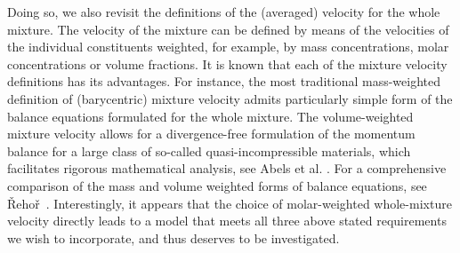 \documentclass[a4paper]{article}
\begin{document}
Doing so, we also revisit the definitions of the (averaged) velocity for the whole mixture. The velocity of the mixture can be defined by means of the velocities of the individual constituents weighted, for example, by mass concentrations, molar concentrations or volume fractions. It is known that each of the mixture velocity definitions has its advantages. For instance, the most traditional mass-weighted definition of (barycentric) mixture velocity admits particularly simple form of the balance equations formulated for the whole mixture. The volume-weighted mixture velocity allows for a divergence-free formulation of the momentum balance for a large class of so-called quasi-incompressible materials, which facilitates rigorous mathematical analysis, see Abels et al. \cite{abels2012,abels2013}. For a comprehensive comparison of the mass and volume weighted forms of balance equations, see \v{R}eho\v{r}~\cite{rehor-2018}. Interestingly, it appears that the choice of molar-weighted whole-mixture velocity directly leads to a model that meets all three above stated requirements we wish to incorporate, and thus deserves to be investigated. 
\end{document}
